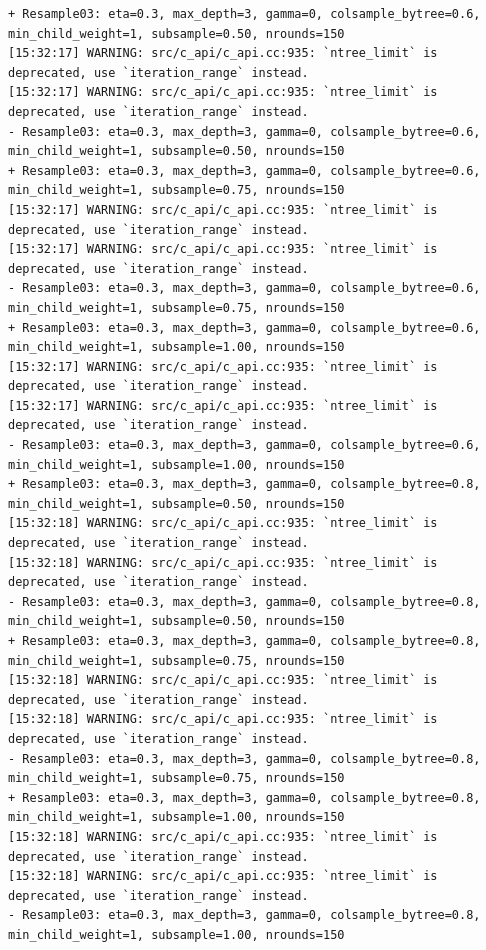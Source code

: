 \documentclass[
  letterpaper,
  DIV=11,
  numbers=noendperiod]{scrartcl}
\begin{document}
\begin{verbatim}
+ Resample03: eta=0.3, max_depth=3, gamma=0, colsample_bytree=0.6, min_child_weight=1, subsample=0.50, nrounds=150 
[15:32:17] WARNING: src/c_api/c_api.cc:935: `ntree_limit` is deprecated, use `iteration_range` instead.
[15:32:17] WARNING: src/c_api/c_api.cc:935: `ntree_limit` is deprecated, use `iteration_range` instead.
- Resample03: eta=0.3, max_depth=3, gamma=0, colsample_bytree=0.6, min_child_weight=1, subsample=0.50, nrounds=150 
+ Resample03: eta=0.3, max_depth=3, gamma=0, colsample_bytree=0.6, min_child_weight=1, subsample=0.75, nrounds=150 
[15:32:17] WARNING: src/c_api/c_api.cc:935: `ntree_limit` is deprecated, use `iteration_range` instead.
[15:32:17] WARNING: src/c_api/c_api.cc:935: `ntree_limit` is deprecated, use `iteration_range` instead.
- Resample03: eta=0.3, max_depth=3, gamma=0, colsample_bytree=0.6, min_child_weight=1, subsample=0.75, nrounds=150 
+ Resample03: eta=0.3, max_depth=3, gamma=0, colsample_bytree=0.6, min_child_weight=1, subsample=1.00, nrounds=150 
[15:32:17] WARNING: src/c_api/c_api.cc:935: `ntree_limit` is deprecated, use `iteration_range` instead.
[15:32:17] WARNING: src/c_api/c_api.cc:935: `ntree_limit` is deprecated, use `iteration_range` instead.
- Resample03: eta=0.3, max_depth=3, gamma=0, colsample_bytree=0.6, min_child_weight=1, subsample=1.00, nrounds=150 
+ Resample03: eta=0.3, max_depth=3, gamma=0, colsample_bytree=0.8, min_child_weight=1, subsample=0.50, nrounds=150 
[15:32:18] WARNING: src/c_api/c_api.cc:935: `ntree_limit` is deprecated, use `iteration_range` instead.
[15:32:18] WARNING: src/c_api/c_api.cc:935: `ntree_limit` is deprecated, use `iteration_range` instead.
- Resample03: eta=0.3, max_depth=3, gamma=0, colsample_bytree=0.8, min_child_weight=1, subsample=0.50, nrounds=150 
+ Resample03: eta=0.3, max_depth=3, gamma=0, colsample_bytree=0.8, min_child_weight=1, subsample=0.75, nrounds=150 
[15:32:18] WARNING: src/c_api/c_api.cc:935: `ntree_limit` is deprecated, use `iteration_range` instead.
[15:32:18] WARNING: src/c_api/c_api.cc:935: `ntree_limit` is deprecated, use `iteration_range` instead.
- Resample03: eta=0.3, max_depth=3, gamma=0, colsample_bytree=0.8, min_child_weight=1, subsample=0.75, nrounds=150 
+ Resample03: eta=0.3, max_depth=3, gamma=0, colsample_bytree=0.8, min_child_weight=1, subsample=1.00, nrounds=150 
[15:32:18] WARNING: src/c_api/c_api.cc:935: `ntree_limit` is deprecated, use `iteration_range` instead.
[15:32:18] WARNING: src/c_api/c_api.cc:935: `ntree_limit` is deprecated, use `iteration_range` instead.
- Resample03: eta=0.3, max_depth=3, gamma=0, colsample_bytree=0.8, min_child_weight=1, subsample=1.00, nrounds=150 

\end{verbatim}
\end{document}
